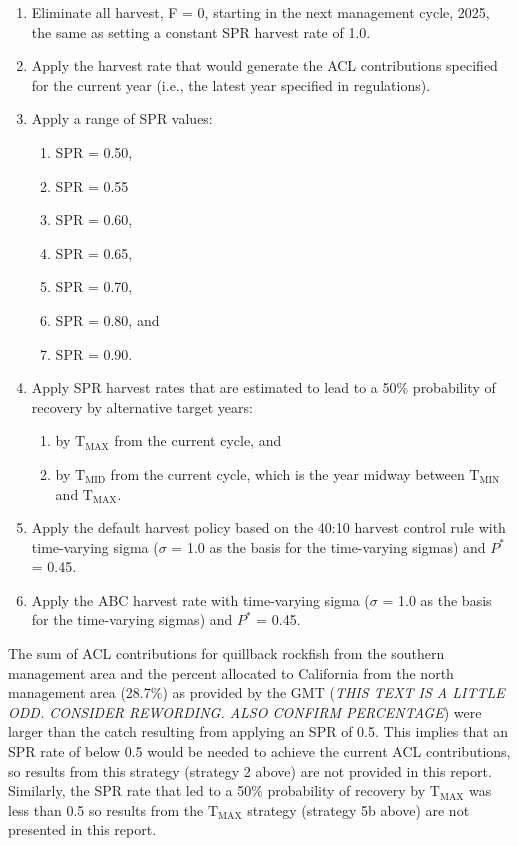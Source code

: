 \documentclass[11pt,
  letterpaper,
]{article}
\begin{document}
\begin{enumerate}
    \item Eliminate all harvest, F = 0, starting in the next management cycle, 2025, the same as setting a constant SPR harvest rate of 1.0.
    \item Apply the harvest rate that would generate the ACL contributions specified for the current year (i.e., the latest year specified in regulations). 
    \item Apply a range of SPR values: 
    \begin{enumerate}
     \item SPR = 0.50,
     \item SPR = 0.55
     \item SPR = 0.60,
     \item SPR = 0.65,
     \item SPR = 0.70,
     \item SPR = 0.80, and
     \item SPR = 0.90. 
    \end{enumerate}
    \item Apply SPR harvest rates that are estimated to lead to a 50$\%$ probability of recovery by alternative target years: 
    \begin{enumerate}
     \item by $\text{T}_\text{MAX}$ from the current cycle, and 
     \item by $\text{T}_\text{MID}$ from the current cycle, which is the year midway between $\text{T}_\text{MIN}$ and $\text{T}_\text{MAX}$.
    \end{enumerate}
    \item Apply the default harvest policy based on the 40:10 harvest control rule with time-varying sigma ($\sigma$ = 1.0 as the basis for the time-varying sigmas) and $P^*$ = 0.45.
    \item Apply the ABC harvest rate with time-varying sigma ($\sigma$ = 1.0 as the basis for the time-varying sigmas) and $P^*$ = 0.45.
\end{enumerate}

The sum of ACL contributions for quillback rockfish from the southern management area and the percent allocated to California from the north management area (28.7\(\%\)) as provided by the GMT (\emph{THIS TEXT IS A LITTLE ODD. CONSIDER REWORDING. ALSO CONFIRM PERCENTAGE}) were larger than the catch resulting from applying an SPR of 0.5. This implies that an SPR rate of below 0.5 would be needed to achieve the current ACL contributions, so results from this strategy (strategy 2 above) are not provided in this report. Similarly, the SPR rate that led to a 50\(\%\) probability of recovery by \(\text{T}_\text{MAX}\) was less than 0.5 so results from the \(\text{T}_\text{MAX}\) strategy (strategy 5b above) are not presented in this report.
\end{document}
